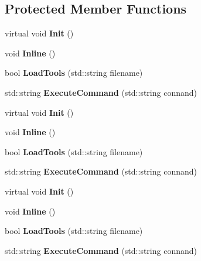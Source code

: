 \subsection*{Protected Member Functions}
\begin{DoxyCompactItemize}
\item 
\hypertarget{classToolChain_ab705c173cb72d1d35865f7435bcb9f0b}{virtual void {\bfseries Init} ()}\label{classToolChain_ab705c173cb72d1d35865f7435bcb9f0b}

\item 
\hypertarget{classToolChain_ac1cc0e9d9f6b2d23adb9eab2d7a58119}{void {\bfseries Inline} ()}\label{classToolChain_ac1cc0e9d9f6b2d23adb9eab2d7a58119}

\item 
\hypertarget{classToolChain_ac1b120b81163d9e00ee778fbc40ddb23}{bool {\bfseries Load\-Tools} (std\-::string filename)}\label{classToolChain_ac1b120b81163d9e00ee778fbc40ddb23}

\item 
\hypertarget{classToolChain_a6ce65465365bf2b6da10b5d28028afcb}{std\-::string {\bfseries Execute\-Command} (std\-::string connand)}\label{classToolChain_a6ce65465365bf2b6da10b5d28028afcb}

\item 
\hypertarget{classToolChain_aca479d6490c01c91d395c9cda5934d78}{virtual void {\bfseries Init} ()}\label{classToolChain_aca479d6490c01c91d395c9cda5934d78}

\item 
\hypertarget{classToolChain_ac1cc0e9d9f6b2d23adb9eab2d7a58119}{void {\bfseries Inline} ()}\label{classToolChain_ac1cc0e9d9f6b2d23adb9eab2d7a58119}

\item 
\hypertarget{classToolChain_ac1b120b81163d9e00ee778fbc40ddb23}{bool {\bfseries Load\-Tools} (std\-::string filename)}\label{classToolChain_ac1b120b81163d9e00ee778fbc40ddb23}

\item 
\hypertarget{classToolChain_a6ce65465365bf2b6da10b5d28028afcb}{std\-::string {\bfseries Execute\-Command} (std\-::string connand)}\label{classToolChain_a6ce65465365bf2b6da10b5d28028afcb}

\item 
\hypertarget{classToolChain_aca479d6490c01c91d395c9cda5934d78}{virtual void {\bfseries Init} ()}\label{classToolChain_aca479d6490c01c91d395c9cda5934d78}

\item 
\hypertarget{classToolChain_ac1cc0e9d9f6b2d23adb9eab2d7a58119}{void {\bfseries Inline} ()}\label{classToolChain_ac1cc0e9d9f6b2d23adb9eab2d7a58119}

\item 
\hypertarget{classToolChain_ac1b120b81163d9e00ee778fbc40ddb23}{bool {\bfseries Load\-Tools} (std\-::string filename)}\label{classToolChain_ac1b120b81163d9e00ee778fbc40ddb23}

\item 
\hypertarget{classToolChain_a6ce65465365bf2b6da10b5d28028afcb}{std\-::string {\bfseries Execute\-Command} (std\-::string connand)}\label{classToolChain_a6ce65465365bf2b6da10b5d28028afcb}

\end{DoxyCompactItemize}
